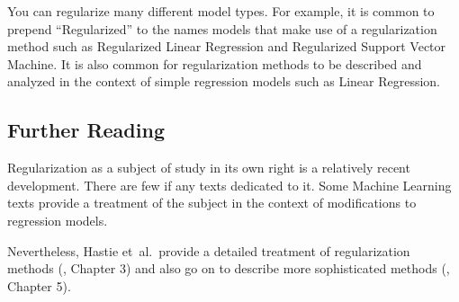 \begin{bibunit}
You can regularize many different model types. For example, it is common to prepend ``Regularized'' to the names models that make use of a regularization method such as Regularized Linear Regression and Regularized Support Vector Machine. It is also common for regularization methods to be described and analyzed in the context of simple regression models such as Linear Regression.

\subsection{Further Reading}
Regularization as a subject of study in its own right is a relatively recent development. There are few if any texts dedicated to it. Some Machine Learning texts provide a treatment of the subject in the context of modifications to regression models.

Nevertheless, Hastie et~al.\ provide a detailed treatment of regularization methods (\cite{Hastie2009}, Chapter 3) and also go on to describe more sophisticated methods (\cite{Hastie2009}, Chapter 5).

\putbib
\end{bibunit}

\newpage\begin{bibunit}\putbib\end{bibunit}
\newpage\begin{bibunit}\putbib\end{bibunit}
\newpage\begin{bibunit}\putbib\end{bibunit}
